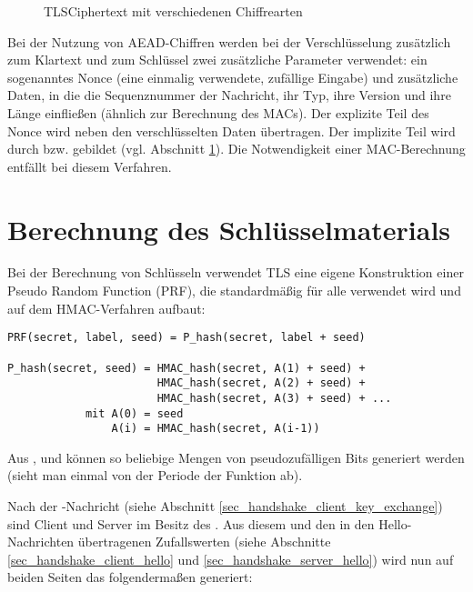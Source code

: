 \begin{figure}[H]
	\caption{TLSCiphertext mit verschiedenen Chiffrearten}
	\label{fig_tls_cipher_types}
\end{figure}

Bei der Nutzung von AEAD-Chiffren werden bei der Verschlüsselung zusätzlich zum Klartext und zum Schlüssel zwei zusätzliche Parameter verwendet: ein sogenanntes Nonce (eine einmalig verwendete, zufällige Eingabe) und zusätzliche Daten, in die die Sequenznummer der Nachricht, ihr Typ, ihre Version und ihre Länge einfließen (ähnlich zur Berechnung des MACs). Der explizite Teil des Nonce wird neben den verschlüsselten Daten übertragen. Der implizite Teil wird durch  bzw.  gebildet (vgl. Abschnitt \ref{sec_key_material}). Die Notwendigkeit einer MAC-Berechnung entfällt bei diesem Verfahren.

\section{Berechnung des Schlüsselmaterials}
\label{sec_key_material}

Bei der Berechnung von Schlüsseln verwendet TLS eine eigene Konstruktion einer Pseudo Random Function (PRF), die standardmäßig für alle \ciphersuites{} verwendet wird und auf dem HMAC-Verfahren aufbaut:

\begin{lstlisting}
PRF(secret, label, seed) = P_hash(secret, label + seed)

P_hash(secret, seed) = HMAC_hash(secret, A(1) + seed) +
					   HMAC_hash(secret, A(2) + seed) +
					   HMAC_hash(secret, A(3) + seed) + ...
			mit A(0) = seed
				A(i) = HMAC_hash(secret, A(i-1))
\end{lstlisting}

Aus ,  und  können so beliebige Mengen von pseudozufälligen Bits generiert werden (sieht man einmal von der Periode der Funktion ab).

Nach der \clientkeyexchange{}-Nachricht (siehe Abschnitt \ref{sec_handshake_client_key_exchange}) sind Client und Server im Besitz des \premastersecret{}. Aus diesem und den in den Hello-Nachrichten übertragenen Zufallswerten (siehe Abschnitte \ref{sec_handshake_client_hello} und \ref{sec_handshake_server_hello}) wird nun auf beiden Seiten das \mastersecret{} folgendermaßen generiert:

